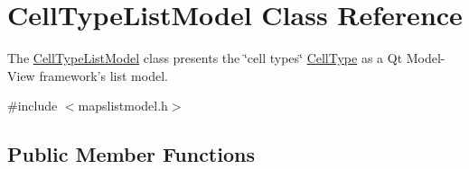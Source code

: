\hypertarget{class_cell_type_list_model}{\section{\-Cell\-Type\-List\-Model \-Class \-Reference}
\label{class_cell_type_list_model}
}


\-The \hyperlink{class_cell_type_list_model}{\-Cell\-Type\-List\-Model} class presents the \char`\"{}cell types\char`\"{} \hyperlink{class_cell_type}{\-Cell\-Type} as a \-Qt \-Model-\/\-View framework's list model.  




{\ttfamily \#include $<$mapslistmodel.\-h$>$}

\subsection*{\-Public \-Member \-Functions}
